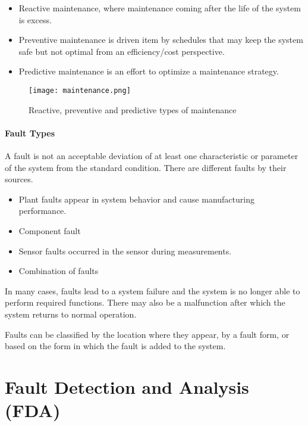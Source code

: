 \begin{itemize}
    \item Reactive maintenance, where maintenance coming after the life of
        the system is excess.
    \item Preventive maintenance is driven item by
        schedules that may keep the system safe but not optimal from an
        efficiency/cost perspective. 
    \item Predictive maintenance is an
        effort to optimize a maintenance strategy.
\end{itemize}

\begin{figure}[h!]
    \centering
    \texttt{[image: maintenance.png]}
    \caption{Reactive, preventive and predictive types of maintenance}
    \label{fig:maintenance}
\end{figure}


\paragraph{Fault Types} A fault is not an acceptable deviation of at least one
characteristic or parameter of the system from the standard condition.
There are different faults by their sources. 
\begin{itemize}
    \item Plant faults appear in system
        behavior and cause manufacturing performance.
    \item Component fault
    \item Sensor faults occurred in the sensor during measurements.
    \item Combination of faults
\end{itemize}
In many cases, faults lead to a system failure and
the system is no longer able to perform required functions.
There may also be a malfunction after which the system returns to normal
operation. 

Faults can be classified by the location where they appear, by a fault
form, or based on the form in which the fault is added to the system.


% 

\section{Fault Detection and Analysis (FDA)}\label{sec:fda}

